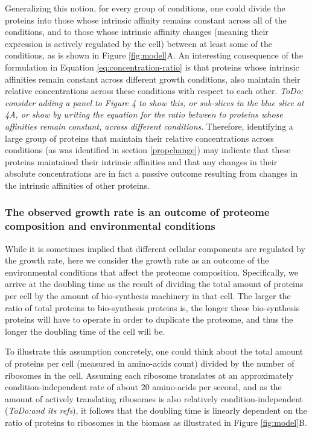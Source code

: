 \documentclass[notitlepage]{article}
\begin{document}
Generalizing this notion, for every group of conditions, one could divide the proteins into those whose intrinsic affinity remains constant across all of the conditions, and to those whose intrinsic affinity changes (meaning their expression is actively regulated by the cell) between at least some of the conditions, as is shown in Figure \ref{fig:model}A.
An interesting consequence of the formulation in Equation \ref{eq:concentration-ratio} is that proteins whose intrinsic affinities remain constant across different growth conditions, also maintain their relative concentrations across these conditions with respect to each other.
\emph{ToDo: consider adding a panel to Figure 4 to show this, or sub-slices in the blue slice at 4A, or show by writing the equation for the ratio between to proteins whose affinities remain constant, across different conditions}.
Therefore, identifying a large group of proteins that maintain their relative concentrations across conditions (as was identified in section \ref{propchange}) may indicate that these proteins maintained their intrinsic affinities and that any changes in their absolute concentrations are in fact a passive outcome resulting from changes in the intrinsic affinities of other proteins.

\subsubsection{The observed growth rate is an outcome of proteome composition and environmental conditions}
While it is sometimes implied that different cellular components are regulated by the growth rate, here we consider the growth rate as an outcome of the environmental conditions that affect the proteome composition.
Specifically, we arrive at the doubling time as the result of dividing the total amount of proteins per cell by the amount of bio-synthesis machinery in that cell.
The larger the ratio of total proteins to bio-synthesis proteins is, the longer these bio-synthesis proteins will have to operate in order to duplicate the proteome, and thus the longer the doubling time of the cell will be.

To illustrate this assumption concretely, one could think about the total amount of proteins per cell (measured in amino-acids count) divided by the number of ribosomes in the cell.
Assuming each ribosome translates at an approximately condition-independent rate of about 20 amino-acids per second, and as the amount of actively translating ribosomes is also relatively condition-independent \parencite{Philips2009} (\emph{ToDo:and its refs}), it follows that the doubling time is linearly dependent on the ratio of proteins to ribosomes in the biomass as illustrated in Figure \ref{fig:model}B.
\end{document}
